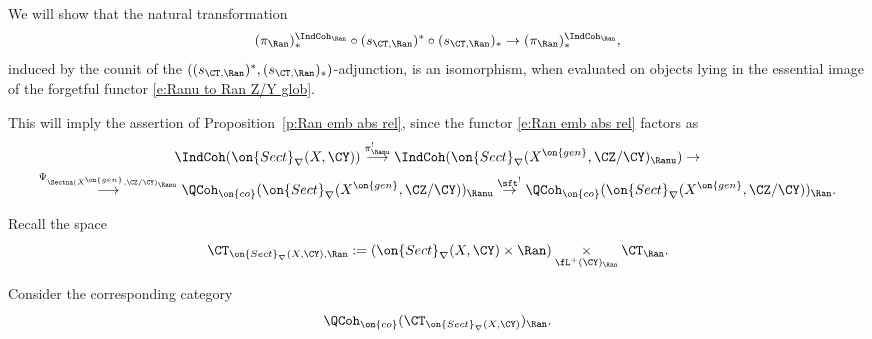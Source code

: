 \documentclass[9pt]{amsart}
\theoremstyle{remark}
\theoremstyle{definition}
\theoremstyle{remark}
\newcommand{\propref}[1]{Proposition~\ref{#1}}
\numberwithin{equation}{section}
\begin{document}
\medskip

We will show that the natural transformation
\begin{equation} \label{e:factor nat transf compos}
(\pi_\Ran)^{\IndCoh_\Ran}_*\circ (s_{\CT,\Ran})^*\circ (s_{\CT,\Ran})_*\to (\pi_\Ran)^{\IndCoh_\Ran}_*,
\end{equation} 
induced by the counit of the $((s_{\CT,\Ran})^*,(s_{\CT,\Ran})_*)$-adjunction, is an isomorphism,
when evaluated on objects lying in the essential image of the forgetful functor \eqref{e:Ranu to Ran Z/Y glob}.

\medskip

This will imply the assertion of \propref{p:Ran emb abs rel}, since the functor \eqref{e:Ran emb abs rel} factors as
\begin{multline*} 
\IndCoh(\on{Sect}_\nabla(X,\CY)) \overset{\pi_\Ranu^!}\longrightarrow 
\IndCoh(\on{Sect}_\nabla(X^{\on{gen}},\CZ/\CY)_\Ranu) \to \\
\overset{\Psi_{\Sectna(X^{\on{gen}},\CZ/\CY)_\Ranu}}\longrightarrow
\QCoh_{\on{co}}(\on{Sect}_\nabla(X^{\on{gen}},\CZ/\CY))_\Ranu \overset{\sft^!}\to \QCoh_{\on{co}}(\on{Sect}_\nabla(X^{\on{gen}},\CZ/\CY))_\Ran.
\end{multline*}

\sssec{}

Recall the space 
$$\CT_{\on{Sect}_\nabla(X,\CY),\Ran}:=(\on{Sect}_\nabla(X,\CY)\times \Ran)\underset{\fL^+(\CY)_\Ran}\times \CT_\Ran.$$

\medskip

Consider the corresponding category
$$\QCoh_{\on{co}}(\CT_{\on{Sect}_\nabla(X,\CY)})_\Ran.$$

%
%
%
%
\end{document}
